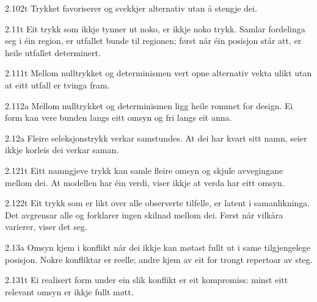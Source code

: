 \begin{formproposition}{2.102}{t}
Trykket favoriserer og svekkjer alternativ utan å stengje dei.
\end{formproposition}

\begin{formproposition}{2.11}{t}
Eit trykk som ikkje tynner ut noko, er ikkje noko trykk. Samlar fordelinga seg i éin region, er utfallet bunde til regionen; først når éin posisjon står att, er heile utfallet determinert.
\end{formproposition}

\begin{formproposition}{2.111}{t}
Mellom nulltrykket og determinismen vert opne alternativ vekta ulikt utan at eitt utfall er tvinga fram.
\end{formproposition}

\begin{formproposition}{2.112}{a}
Mellom nulltrykket og determinismen ligg heile rommet for design. Ei form kan vere bunden langs eitt omsyn og fri langs eit anna.
\end{formproposition}

\begin{formproposition}{2.12}{a}
Fleire seleksjonstrykk verkar samstundes. At dei har kvart sitt namn, seier ikkje korleis dei verkar saman.
\end{formproposition}

\begin{formproposition}{2.121}{t}
Eitt namngjeve trykk kan samle fleire omsyn og skjule avvegingane mellom dei. At modellen har éin verdi, viser ikkje at verda har eitt omsyn.
\end{formproposition}

\begin{formproposition}{2.122}{t}
Eit trykk som er likt over alle observerte tilfelle, er latent i samanlikninga. Det avgrensar alle og forklarer ingen skilnad mellom dei. Først når vilkåra varierer, viser det seg.
\end{formproposition}

\begin{formproposition}{2.13}{a}
Omsyn kjem i konflikt når dei ikkje kan møtast fullt ut i same tilgjengelege posisjon. Nokre konfliktar er reelle; andre kjem av eit for trongt repertoar av steg.
\end{formproposition}

\begin{formproposition}{2.131}{t}
Ei realisert form under ein slik konflikt er eit kompromiss: minst eitt relevant omsyn er ikkje fullt møtt.
\end{formproposition}

